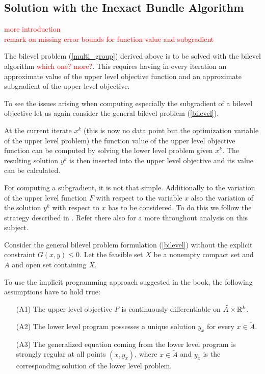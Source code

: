 \subsection{Solution with the Inexact Bundle Algorithm}

\textcolor{red}{more introduction\\
remark on missing error bounds for function value and subgradient}

The bilevel problem (\ref{multi_group}) derived above is to be solved with the bilevel algorithm \textcolor{red}{which one? more?}.
This requires having in every iteration an approximate value of the upper level objective function and an approximate subgradient of the upper level objective.

To see the issues arising when computing especially the subgradient of a bilevel objective let us again consider the general bilevel problem (\ref{bilevel}).

At the current iterate \(x^k\) (this is now no data point but the optimization variable of the upper level problem) the function value of the upper level objective function can be computed by solving the lower level problem given \(x^k\).
The resulting solution \(y^k\) is then inserted into the upper level objective and its value can be calculated.

For computing a subgradient, it is not that simple. Additionally to the variation of the upper level function \(F\) with respect to the variable \(x\) also the variation of the solution \(y^k\) with respect to \(x\) has to be considered.
To do this we follow the strategy described in \cite{Outrata1998}. Refer there also for a more throughout analysis on this subject.

Consider the general bilevel problem formulation (\ref{bilevel}) without the explicit constraint \(G(x,y) \leq 0\).
Let the feasible set \(X\) be a nonempty compact set and \(\tilde{A}\) and open set containing \(X\).

To use the implicit programming approach suggested in the book,  the following assumptions have to hold true:

\begin{itemize}
\item[(A1)] The upper level objective \(F\) is continuously differentiable on \(\tilde{A}\times \mathbb{R}^k\).
\item[(A2)] The lower level program possesses a unique solution \(y_x\) for every \(x\in \tilde{A}\).
\item[(A3)] The generalized equation coming from the lower level program is strongly regular at all points \((x,y_x)\), where \(x \in \tilde{A}\) and \(y_x\) is the corresponding solution of the lower level problem.
\end{itemize}

